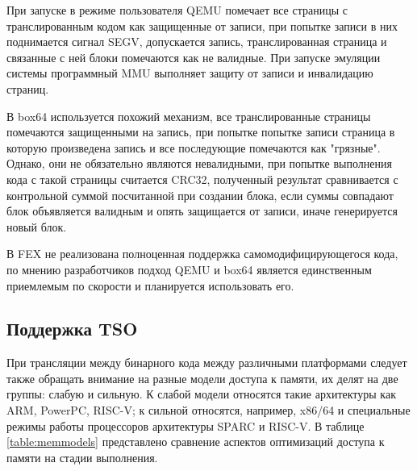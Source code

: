 При запуске в режиме пользователя QEMU помечает все страницы с транслированным кодом как защищенные от записи, при попытке записи в них поднимается сигнал SEGV, допускается запись, транслированная страница и связанные с ней блоки помечаются как не валидные. При запуске эмуляции системы программный MMU выполняет защиту от записи и инвалидацию страниц. \cite{qemu_docs}

В box64 используется похожий механизм, все транслированные страницы помечаются защищенными на запись, при попытке попытке записи страница в которую произведена запись и все последующие помечаются как "грязные". Однако, они не обязательно являются невалидными, при попытке выполнения кода с такой страницы считается CRC32, полученный результат сравнивается с контрольной суммой посчитанной при создании блока, если суммы совпадают блок объявляется валидным и опять защищается от записи, иначе генерируется новый блок. \cite{box64_letter}

В FEX не реализована полноценная поддержка самомодифицирующегося кода, по мнению разработчиков подход QEMU и box64 является единственным приемлемым по скорости и планируется использовать его. \cite{FEX_letter}

\subsection{Поддержка TSO}

При трансляции между бинарного кода между различными платформами следует также обращать внимание на разные модели доступа к памяти, их делят на две группы: слабую и сильную. К слабой модели относятся такие архитектуры как ARM, PowerPC, RISC-V; к сильной относятся, например, x86/64 и специальные режимы работы процессоров архитектуры SPARC и RISC-V. В таблице \ref{table:memmodels} представлено сравнение аспектов оптимизаций доступа к памяти на стадии выполнения.

\begin{table}[!htb]
	\begin{center}
		\label{table:memmodels}
		\caption{Таблица переупорядочиваний обращений к памяти \cite{memry}}
	\end{center}
\end{table}

